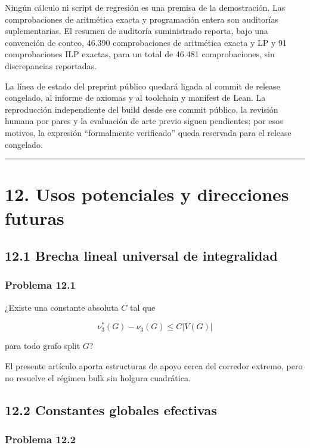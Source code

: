 \documentclass[
  11pt,
]{article}
\begin{document}
Ningún cálculo ni script de regresión es una premisa de la demostración.
Las comprobaciones de aritmética exacta y programación entera son
auditorías suplementarias. El resumen de auditoría suministrado reporta,
bajo una convención de conteo, 46.390 comprobaciones de aritmética
exacta y LP y 91 comprobaciones ILP exactas, para un total de 46.481
comprobaciones, sin discrepancias reportadas.

La línea de estado del preprint público quedará ligada al commit de
release congelado, al informe de axiomas y al toolchain y manifest de
Lean. La reproducción independiente del build desde ese commit público,
la revisión humana por pares y la evaluación de arte previo siguen
pendientes; por esos motivos, la expresión ``formalmente verificado''
queda reservada para el release congelado.

\begin{center}\rule{0.5\linewidth}{0.5pt}\end{center}

\section{12. Usos potenciales y direcciones
futuras}\label{usos-potenciales-y-direcciones-futuras}

\subsection{12.1 Brecha lineal universal de
integralidad}\label{brecha-lineal-universal-de-integralidad}

\subsubsection{Problema 12.1}\label{problema-12.1}

¿Existe una constante absoluta \(C\) tal que

\[
\nu_3^*(G)-\nu_3(G)
\le C|V(G)|
\]

para todo grafo split \(G\)?

El presente artículo aporta estructuras de apoyo cerca del corredor
extremo, pero no resuelve el régimen bulk sin holgura cuadrática.

\subsection{12.2 Constantes globales
efectivas}\label{constantes-globales-efectivas}

\subsubsection{Problema 12.2}\label{problema-12.2}
\end{document}
